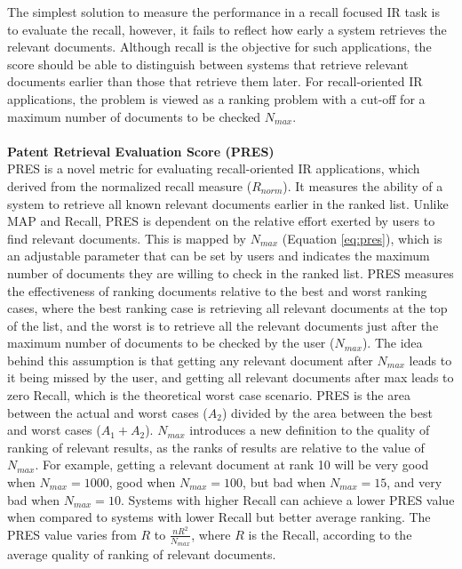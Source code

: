 The simplest solution to measure the performance in a recall focused IR task is to evaluate the recall, however, it fails to reflect how early a system retrieves the relevant documents. Although recall is the objective for such applications, the score should be able to distinguish between systems that retrieve relevant documents earlier than those that retrieve them later. For recall-oriented IR applications, the problem is viewed as a ranking problem with a cut-off for a maximum number of documents to be checked $ N_{max} $.\\\\
\textbf{Patent Retrieval Evaluation Score (PRES)}
\ \\
PRES is a novel metric for evaluating recall-oriented IR applications, which derived from the normalized recall measure ($ R_{norm} $). It measures the ability of a system to retrieve all known relevant documents earlier in the ranked list. Unlike MAP and Recall, PRES is dependent on the relative effort exerted by users to find relevant documents. This is mapped by $ N_{max} $ (Equation \ref{eq:pres}), which is an adjustable parameter that can be set by users and indicates the maximum number of documents they are willing to check in the ranked list. PRES measures the effectiveness of ranking documents relative to the best and worst ranking cases, where the best ranking case is retrieving all relevant documents at the top of the list, and the worst is to retrieve all the relevant documents just after the maximum number of documents to
be checked by the user ($ N_{max} $). The idea behind this assumption is that getting any relevant document after $ N_{max} $ leads to it being missed by the user, and getting all relevant documents after max leads to zero Recall, which is the theoretical worst case scenario. 
PRES is the area between the actual and worst cases ($ A_{2} $) divided by the area between the best and worst cases ($ A_{1}+A_{2} $).
$ N_{max} $ introduces a new definition to the quality of ranking of relevant results, as the ranks of results are relative to the value of $ N_{max} $. For example, getting a relevant document at rank 10 will be very good when $ N_{max}=1000 $, good when $ N_{max}=100 $, but bad when $ N_{max}=15 $, and very bad when $ N_{max}=10 $. Systems with higher Recall can achieve a lower PRES value when compared to systems with lower Recall but better average ranking. The PRES value varies from $ R $ to $ \frac{nR^{2}}{N_{max}} $, where $ R $ is the Recall, according to the average quality of ranking of relevant documents.
